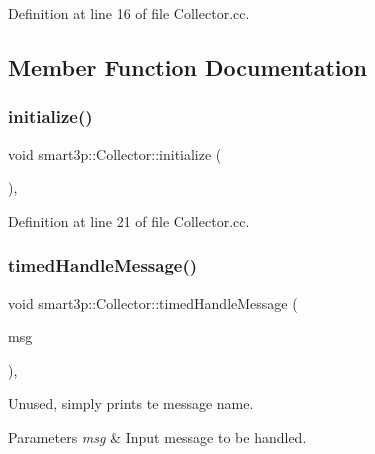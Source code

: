 Definition at line 16 of file Collector.\+cc.



\subsection{Member Function Documentation}
\mbox{\label{classsmart3p_1_1Collector_acc6c1b2f235b3c4acb7ca84f7c356e80}} 
\subsubsection{\texorpdfstring{initialize()}{initialize()}}
{\footnotesize\ttfamily void smart3p\+::\+Collector\+::initialize (\begin{DoxyParamCaption}{ }\end{DoxyParamCaption})\hspace{0.3cm}{\ttfamily [protected]}, {\ttfamily [virtual]}}



Definition at line 21 of file Collector.\+cc.

\mbox{\label{classsmart3p_1_1Collector_a1b82f1a10a2579c3ed25bc899220b906}} 
\subsubsection{\texorpdfstring{timed\+Handle\+Message()}{timedHandleMessage()}}
{\footnotesize\ttfamily void smart3p\+::\+Collector\+::timed\+Handle\+Message (\begin{DoxyParamCaption}\item[{c\+Message $\ast$}]{msg }\end{DoxyParamCaption})\hspace{0.3cm}{\ttfamily [protected]}, {\ttfamily [virtual]}}

Unused, simply prints te message name. 
\begin{DoxyParams}{Parameters}
{\em msg} & Input message to be handled. \\
\hline
\end{DoxyParams}



